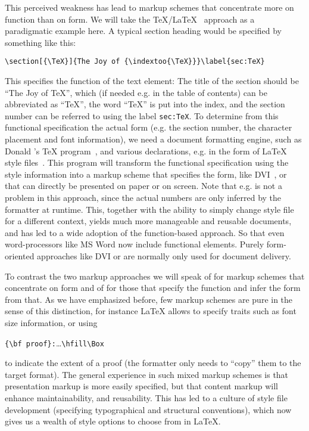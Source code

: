 This perceived weakness has lead to markup schemes that concentrate more on
function than on form. We will take the
{}
{\TeX}/{\LaTeX}~\cite{Knuth:ttb84,Lamport:ladps94} approach as a paradigmatic
example here. A typical section heading would be specified by something like this:
\begin{verbatim}
\section[{\TeX}]{The Joy of {\indextoo{\TeX}}}\label{sec:TeX}
\end{verbatim}
This specifies the function of the text element: The title of the section should
be ``The Joy of {\TeX}'', which (if needed e.g. in the table of contents) can be
abbreviated as ``{\TeX}'', the word ``{\TeX}'' is put into the index, and the
section number can be referred to using the label {\tt{sec:TeX}}. To determine
from this functional specification the actual form (e.g. the section number, the
character placement and font information), we need a document formatting engine,
such as Donald {}'s {\TeX} program~\cite{Knuth:ttb84}, and various
{} declarations, e.g. in the form of {\LaTeX} style
files~\cite{Lamport:ladps94}. This program
will transform the functional specification using the style information into a
markup scheme that specifies the form, like
{DVI}~\cite{Knuth:ttb84}, or
{\postscript{}}~\cite{Reid:plpd87} that can directly
be presented on paper or on screen. Note that e.g.  {} is not
a problem in this approach, since the actual numbers are only inferred by the
formatter at runtime. This, together with the ability to simply change style file
for a different context, yields much more manageable and reusable documents, and
has led to a wide adoption of the function-based approach. So that even
word-processors like MS Word now include functional elements. Purely form-oriented
approaches like {DVI} or
{\postscript{}} are normally only used for document
delivery.

To contrast the two markup approaches we will speak of {} for markup schemes that concentrate on
form and of {} for those that specify
the function and infer the form from that. As we have emphasized before, few
markup schemes are pure in the sense of this distinction, for instance {\LaTeX}
allows to specify traits such as font size information, or using
\begin{center}
  {\verb+{\bf proof}:+}\ldots{\verb+\hfill\Box+}
\end{center}
to indicate the extent of a proof (the formatter only needs to ``copy'' them to
the target format). The general experience in such mixed markup schemes is that
presentation markup is more easily specified, but that content markup will enhance
maintainability, and reusability. This has led to a culture of style file
development (specifying typographical and structural conventions), which now gives
us a wealth of style options to choose from in {\LaTeX}.

